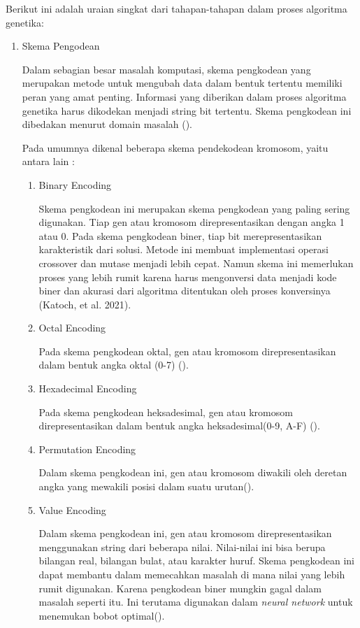 Berikut ini adalah uraian singkat dari tahapan-tahapan dalam proses algoritma genetika:
\begin{enumerate}
  \item Skema Pengodean
  
  Dalam sebagian besar masalah komputasi, skema pengkodean yang merupakan metode untuk 
  mengubah data dalam bentuk tertentu memiliki peran yang amat penting. 
  Informasi yang diberikan dalam proses algoritma genetika harus dikodekan menjadi string bit tertentu. 
  Skema pengkodean ini dibedakan menurut domain masalah (\cite{Katoch2020}).
  
  Pada umumnya dikenal beberapa skema pendekodean kromosom, yaitu antara lain : 
  \begin{enumerate}
    \item Binary Encoding
    
    Skema pengkodean ini merupakan skema pengkodean yang paling sering \linebreak digunakan. 
    Tiap gen atau kromosom direpresentasikan dengan angka 1 atau 0. Pada skema pengkodean biner, 
    tiap bit merepresentasikan karakteristik dari solusi. Metode ini membuat implementasi operasi 
    crossover dan mutase menjadi lebih cepat. Namun skema ini memerlukan proses yang lebih rumit karena harus \linebreak 
    mengonversi data menjadi kode biner dan akurasi dari algoritma ditentukan oleh proses konversinya (Katoch, et al. 2021).
    \item Octal Encoding
    
    Pada skema pengkodean oktal, gen atau kromosom direpresentasikan dalam bentuk angka oktal (0-7) (\cite{Katoch2020}).
    \item Hexadecimal Encoding
    
    Pada skema pengkodean heksadesimal, gen atau kromosom direpresentasikan dalam bentuk angka heksadesimal(0-9, A-F) (\cite{Katoch2020}).
    \item Permutation Encoding
    
    Dalam skema pengkodean ini, gen atau kromosom diwakili oleh deretan angka yang mewakili posisi dalam suatu urutan(\cite{Katoch2020}). 
    \item Value Encoding
    
    Dalam skema pengkodean ini, gen atau kromosom direpresentasikan menggunakan string dari beberapa nilai. Nilai-nilai ini bisa berupa bilangan real, bilangan bulat, atau karakter huruf. Skema pengkodean ini dapat membantu dalam memecahkan masalah di mana nilai yang lebih rumit digunakan. Karena pengkodean biner mungkin gagal dalam masalah seperti itu. Ini terutama digunakan dalam \emph{neural network} untuk menemukan bobot optimal(\cite{Katoch2020}).


\end{enumerate}
\end{enumerate}
